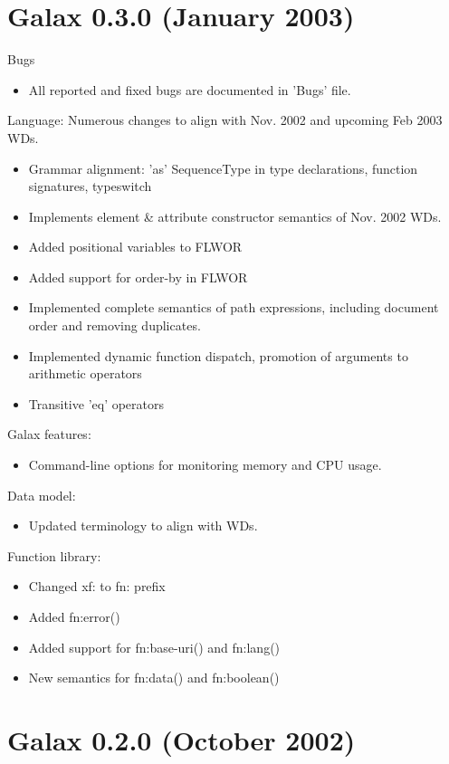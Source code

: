 \section{Galax 0.3.0 (January 2003)}

Bugs
\begin{itemize}
\item All reported and fixed bugs are documented in 'Bugs' file.
\end{itemize}

Language:
Numerous changes to align with Nov. 2002 and upcoming Feb 2003 WDs.
\begin{itemize}
\item Grammar alignment:
  'as' SequenceType in type declarations, function signatures, typeswitch
\item Implements element \& attribute constructor semantics of Nov. 2002 WDs.
\item Added positional variables to FLWOR
\item Added support for order-by in FLWOR
\item Implemented complete semantics of path expressions, including
  document order and removing duplicates.
\item Implemented dynamic function dispatch, promotion of arguments to
  arithmetic operators
\item Transitive 'eq' operators 
\end{itemize}

Galax features:
\begin{itemize}
\item Command-line options for monitoring memory and CPU usage.
\end{itemize}

Data model:
\begin{itemize}
\item Updated terminology to align with WDs.
\end{itemize}

Function library:
\begin{itemize}
\item Changed xf: to fn: prefix
\item Added fn:error()
\item Added support for fn:base-uri() and fn:lang()
\item New semantics for fn:data() and fn:boolean()
\end{itemize}


\section{Galax 0.2.0 (October 2002)}

